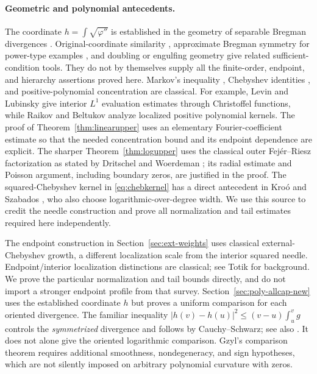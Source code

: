 \documentclass[11pt]{article}
\theoremstyle{definition}\newtheorem{definition}[theorem]{Definition}
\theoremstyle{remark}\newtheorem{remark}[theorem]{Remark}
\newcommand{\ph}{\varphi}
\begin{document}
\paragraph{Geometric and polynomial antecedents.}
The coordinate $h=\int\sqrt{\ph''}$ is established in the geometry of separable Bregman divergences \cite{gomes,gzyl}. Original-coordinate similarity \cite{ackermann}, approximate Bregman symmetry for power-type examples \cite{kindermann}, and doubling or engulfing geometry \cite{calogero,maldonado} give related sufficient-condition tools. They do not by themselves supply all the finite-order, endpoint, and hierarchy assertions proved here. Markov's inequality \cite{shadrin}, Chebyshev identities \cite{dlmf}, and positive-polynomial concentration are classical. For example, Levin and Lubinsky \cite[Theorem 1.3]{levin} give interior $L^1$ evaluation estimates through Christoffel functions, while Raikov and Beltukov \cite{raikov} analyze localized positive polynomial kernels. The proof of Theorem~\ref{thm:linearupper} uses an elementary Fourier-coefficient estimate so that the needed concentration bound and its endpoint dependence are explicit. The sharper Theorem~\ref{thm:logupper} uses the classical outer Fej\'er--Riesz factorization as stated by Dritschel and Woerdeman \cite[Introduction]{dritschelwoerdeman}; its radial estimate and Poisson argument, including boundary zeros, are justified in the proof. The squared-Chebyshev kernel in \eqref{eq:chebkernel} has a direct antecedent in Kro\'o and Szabados \cite[Proposition 1]{krooszabados}, who also choose logarithmic-over-degree width. We use this source to credit the needle construction and prove all normalization and tail estimates required here independently.

The endpoint construction in Section~\ref{sec:ext-weights} uses classical external-Chebyshev growth, a different localization scale from the interior squared needle. Endpoint/interior localization distinctions are classical; see Totik \cite[Section 4]{totik} for background. We prove the particular normalization and tail bounds directly, and do not import a stronger endpoint profile from that survey. Section~\ref{sec:poly-allcap-new} uses the established coordinate $h$ but proves a uniform comparison for each oriented divergence. The familiar inequality $|h(v)-h(u)|^2\le (v-u)\int_u^v g$ controls the \emph{symmetrized} divergence and follows by Cauchy--Schwarz; see also \cite[Section 5, Proposition 8]{nielsen}. It does not alone give the oriented logarithmic comparison. Gzyl's comparison theorem requires additional smoothness, nondegeneracy, and sign hypotheses, which are not silently imposed on arbitrary polynomial curvature with zeros.
\end{document}
